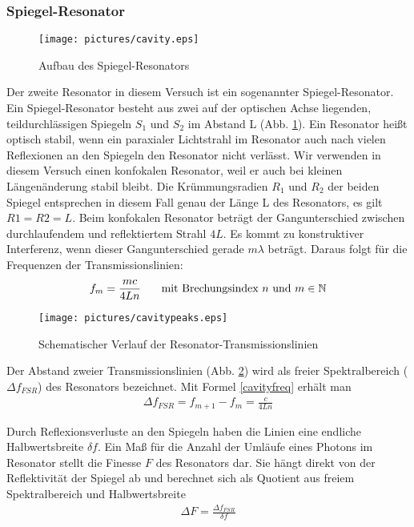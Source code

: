 \documentclass[12pt]{article}
\begin{document}
\subsubsection{Spiegel-Resonator}
\begin{figure}[H]
 \texttt{[image: pictures/cavity.eps]}
 \caption{Aufbau des Spiegel-Resonators}
 \label{cavity}
\end{figure}
Der zweite Resonator in diesem Versuch ist ein sogenannter Spiegel-Resonator. Ein Spiegel-Resonator  besteht aus zwei auf der optischen Achse liegenden,
teildurchlässigen Spiegeln $S_1$ und $S_2$ im Abstand L (Abb. \ref{cavity}). Ein Resonator heißt optisch stabil, wenn ein paraxialer Lichtstrahl im Resonator
auch nach vielen Reflexionen an den Spiegeln den Resonator nicht verlässt. Wir verwenden in diesem Versuch einen konfokalen Resonator, weil er auch bei kleinen Längenänderung stabil bleibt. Die Krümmungsradien $R_1$ und $R_2$ der beiden Spiegel entsprechen in diesem Fall genau der Länge L des Resonators, es gilt $R1 =R2 = L$. Beim konfokalen Resonator beträgt der Gangunterschied zwischen durchlaufendem und reflektiertem Strahl $4L$. Es kommt zu konstruktiver Interferenz, wenn dieser Gangunterschied gerade $m\lambda$  beträgt. Daraus folgt für die Frequenzen der Transmissionslinien:
\begin{align}
\label{cavityfreq}
 f_m = \frac{mc}{4Ln}\hspace{15pt}\textnormal{ mit Brechungsindex }n\textnormal{ und } m \in \mathbb N
\end{align}
\begin{figure}[H]
 \texttt{[image: pictures/cavitypeaks.eps]}
 \caption{Schematischer Verlauf der Resonator-Transmissionslinien}
 \label{cavitypeaks}
\end{figure}
Der Abstand zweier Transmissionslinien (Abb. \ref{cavitypeaks}) wird als freier Spektralbereich ($\Delta f_{FSR}$) des Resonators bezeichnet. Mit Formel \ref{cavityfreq} erhält man
\begin{align}
\label{freespecrange}
 \Delta f_{FSR} = f_{m+1}-f_{m} = \frac{c}{4Ln}
\end{align}
 
Durch Reflexionsverluste an den Spiegeln haben die Linien eine endliche Halbwertsbreite $\delta f$. Ein Maß für die Anzahl der Umläufe eines Photons im Resonator stellt die Finesse $F$ des Resonators dar. Sie hängt direkt von der Reflektivität der Spiegel ab und berechnet sich als Quotient aus freiem Spektralbereich und Halbwertsbreite
\begin{align}
\label{finesse}
 \Delta F  = \frac{\Delta f_{FSR}}{\delta f}
\end{align}
\end{document}
